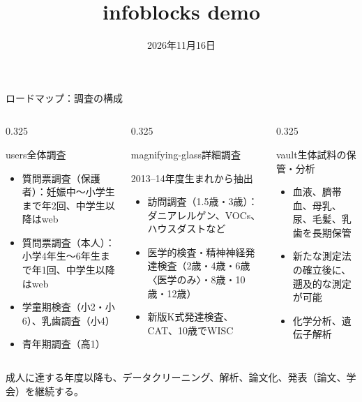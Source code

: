 \documentclass[aspectratio=169,10pt]{beamer}
\title{infoblocks demo}
\date{2026年11月16日}
\begin{document}
\begin{frame}[t]{ロードマップ：調査の構成}
	\begin{columns}[T,totalwidth=\textwidth]
		\begin{column}{0.325\textwidth}
			\begin{infocard}[navy][equal height group=kosei]{users}{全体調査}
				\begin{itemize}
					\item 質問票調査（保護者）：妊娠中〜小学生まで年2回、中学生以降はweb
					\item 質問票調査（本人）：小学4年生〜6年生まで年1回、中学生以降はweb
					\item 学童期検査（小2・小6）、乳歯調査（小4）
					\item 青年期調査（高1）
				\end{itemize}
			\end{infocard}
		\end{column}
		\begin{column}{0.325\textwidth}
			\begin{infocard}[teal][equal height group=kosei]{magnifying-glass}{詳細調査}
				{\tiny\color{black!55}2013--14年度生まれから抽出\par}
				\begin{itemize}
					\item 訪問調査（1.5歳・3歳）：ダニアレルゲン、VOCs、ハウスダストなど
					\item 医学的検査・精神神経発達検査（2歳・4歳・6歳〈医学のみ〉・8歳・10歳・12歳）
					\item 新版K式発達検査、CAT、10歳でWISC
				\end{itemize}
			\end{infocard}
		\end{column}
		\begin{column}{0.325\textwidth}
			\begin{infocard}[red][equal height group=kosei]{vault}{生体試料の保管・分析}
				\begin{itemize}
					\item 血液、臍帯血、母乳、尿、毛髪、乳歯を長期保管
					\item 新たな測定法の確立後に、遡及的な測定が可能
					\item 化学分析、遺伝子解析
				\end{itemize}
			\end{infocard}
		\end{column}
	\end{columns}

	\vspace{4pt}
	{\tiny\color{black!55}成人に達する年度以降も、データクリーニング、解析、論文化、発表（論文、学会）を継続する。}
\end{frame}
\end{document}
